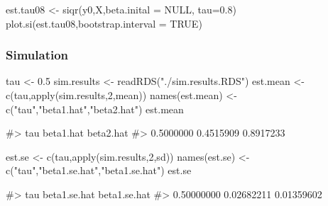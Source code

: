 \begin{Schunk}
\begin{Sinput}
est.tau08 <- siqr(y0,X,beta.inital = NULL, tau=0.8)
plot.si(est.tau08,bootstrap.interval = TRUE)
\end{Sinput}
\end{Schunk}

\hypertarget{simulation}{%
\subsubsection{Simulation}\label{simulation}}

\begin{Schunk}
\end{Schunk}

\begin{Schunk}
\begin{Sinput}
tau <- 0.5
sim.results <- readRDS("./sim.results.RDS")
est.mean <- c(tau,apply(sim.results,2,mean))
names(est.mean) <- c("tau","beta1.hat","beta2.hat")
est.mean
\end{Sinput}
\begin{Soutput}
#>       tau beta1.hat beta2.hat 
#> 0.5000000 0.4515909 0.8917233
\end{Soutput}
\end{Schunk}

\begin{Schunk}
\begin{Sinput}
est.se <- c(tau,apply(sim.results,2,sd))
names(est.se) <- c("tau","beta1.se.hat","beta1.se.hat")
est.se
\end{Sinput}
\begin{Soutput}
#>          tau beta1.se.hat beta1.se.hat 
#>   0.50000000   0.02682211   0.01359602
\end{Soutput}
\end{Schunk}

